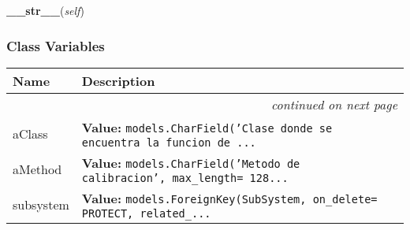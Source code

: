     \label{GroundSegment:models:Calibration:Calibration:__str__}

    \vspace{0.5ex}

\hspace{.8\funcindent}\begin{boxedminipage}{\funcwidth}

    \raggedright \textbf{\_\_str\_\_}(\textit{self})

\setlength{\parskip}{2ex}
\setlength{\parskip}{1ex}
    \end{boxedminipage}



  \subsubsection{Class Variables}

    \vspace{-1cm}
\hspace{\varindent}\begin{longtable}{|p{\varnamewidth}|p{\vardescrwidth}|l}
\cline{1-2}
\cline{1-2} \centering \textbf{Name} & \centering \textbf{Description}& \\
\cline{1-2}
\endhead\cline{1-2}\multicolumn{3}{r}{\small\textit{continued on next page}}\\\endfoot\cline{1-2}
\endlastfoot\raggedright a\-C\-l\-a\-s\-s\- & \raggedright \textbf{Value:} 
{\tt models.CharField('Clase donde se encuentra la funcion de \texttt{...}}&\\
\cline{1-2}
\raggedright a\-M\-e\-t\-h\-o\-d\- & \raggedright \textbf{Value:} 
{\tt models.CharField('Metodo de calibracion', max\_length= 128\texttt{...}}&\\
\cline{1-2}
\raggedright s\-u\-b\-s\-y\-s\-t\-e\-m\- & \raggedright \textbf{Value:} 
{\tt models.ForeignKey(SubSystem, on\_delete= PROTECT, related\_\texttt{...}}&\\
\cline{1-2}
\end{longtable}

